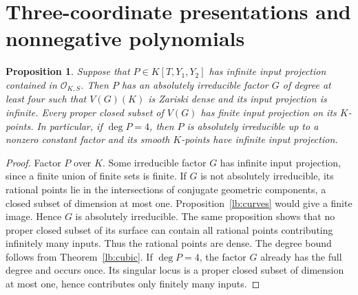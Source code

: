 \documentclass[11pt,a4paper]{article}
\newtheorem{proposition}[theorem]{Proposition}
\theoremstyle{definition}
\newcommand{\OKS}{\mathcal O_{K,S}}
\begin{document}
\section{Three-coordinate presentations and nonnegative polynomials}\label{lb:positivity-section}

\begin{proposition}\label{lb:three-surface}
Suppose that $P\in K[T,Y_1,Y_2]$ has infinite input projection
contained in $\OKS$. Then $P$ has an absolutely irreducible factor
$G$ of degree at least four such that $V(G)(K)$ is Zariski dense
and its input projection is infinite. Every proper closed subset
of $V(G)$ has finite input projection on its $K$-points.
In particular, if $\deg P=4$, then $P$ is absolutely irreducible
up to a nonzero constant factor and its smooth $K$-points have
infinite input projection.
\end{proposition}
\begin{proof}
Factor $P$ over $K$. Some irreducible factor $G$ has infinite
input projection, since a finite union of finite sets is finite.
If $G$ is not absolutely irreducible, its rational points lie
in the intersections of conjugate geometric components, a
closed subset of dimension at most one. Proposition~\ref{lb:curves}
would give a finite image. Hence $G$ is absolutely irreducible.
The same proposition shows that no proper closed subset of its
surface can contain all rational points contributing infinitely
many inputs. Thus the rational points are dense. The degree
bound follows from Theorem~\ref{lb:cubic}. If $\deg P=4$,
the factor $G$ already has the full degree and occurs once.
Its singular locus is a proper closed subset of dimension at
most one, hence contributes only finitely many inputs.
\end{proof}
\end{document}
